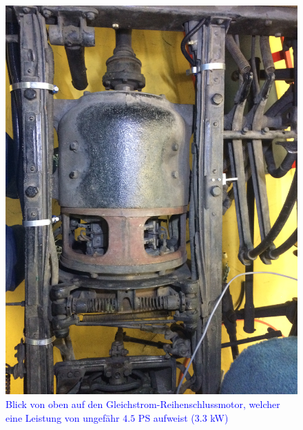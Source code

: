 \begin{landscape}
\begin{figure}[h]
		\includegraphics[angle=180,width=1.30\textwidth]{images/Anhang/Motor.jpg}
	\caption{\textcolor{blue}{Blick von oben auf den Gleichstrom-Reihenschlussmotor, welcher eine Leistung von ungefähr $4.5$ PS aufweist ($3.3$ kW)}}
	\label{fig:Motor}
\end{figure}
\begin{figure}[h]
	\centering

\end{figure}
\end{landscape}
